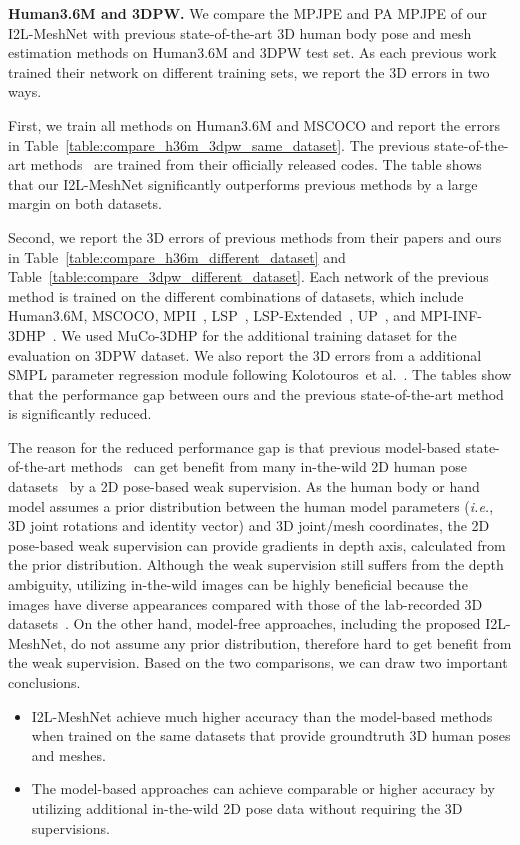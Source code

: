 \documentclass[runningheads]{llncs}
\begin{document}
\noindent \textbf{Human3.6M and 3DPW.}
We compare the MPJPE and PA MPJPE of our I2L-MeshNet with previous state-of-the-art 3D human body pose and mesh estimation methods on Human3.6M and 3DPW test set.
As each previous work trained their network on different training sets, we report the 3D errors in two ways.


First, we train all methods on Human3.6M and MSCOCO and report the errors in Table~\ref{table:compare_h36m_3dpw_same_dataset}.
The previous state-of-the-art methods~\cite{kanazawa2018end,kolotouros2019convolutional,kolotouros2019learning} are trained from their officially released codes.
The table shows that our I2L-MeshNet significantly outperforms previous methods by a large margin on both datasets.


Second, we report the 3D errors of previous methods from their papers and ours in Table~\ref{table:compare_h36m_different_dataset} and Table~\ref{table:compare_3dpw_different_dataset}. 
Each network of the previous method is trained on the different combinations of datasets, which include Human3.6M, MSCOCO, MPII~\cite{andriluka20142d}, LSP~\cite{johnson2010clustered}, LSP-Extended~\cite{johnson2011learning}, UP~\cite{lassner2017unite}, and MPI-INF-3DHP~\cite{mehta2017monocular}.
We used MuCo-3DHP for the additional training dataset for the evaluation on 3DPW dataset.
We also report the 3D errors from a additional SMPL parameter regression module following Kolotouros~et al.~\cite{kolotouros2019convolutional}.
The tables show that the performance gap between ours and the previous state-of-the-art method~\cite{kolotouros2019learning} is significantly reduced.


The reason for the reduced performance gap is that previous model-based state-of-the-art methods~\cite{kanazawa2018end,kolotouros2019learning} can get benefit from many in-the-wild 2D human pose datasets~\cite{lin2014microsoft,johnson2010clustered,johnson2011learning} by a 2D pose-based weak supervision.
As the human body or hand model assumes a prior distribution between the human model parameters (\textit{i.e.}, 3D joint rotations and identity vector) and 3D joint/mesh coordinates, the 2D pose-based weak supervision can provide gradients in depth axis, calculated from the prior distribution.
Although the weak supervision still suffers from the depth ambiguity, utilizing in-the-wild images can be highly beneficial because the images have diverse appearances compared with those of the lab-recorded 3D datasets~\cite{ionescu2014human3,mehta2017monocular,mehta2018single}.
On the other hand, model-free approaches, including the proposed I2L-MeshNet, do not assume any prior distribution, therefore hard to get benefit from the weak supervision.
Based on the two comparisons, we can draw two important conclusions.
\begin{itemize}
\item I2L-MeshNet achieve much higher accuracy than the model-based methods when trained on the same datasets that provide groundtruth 3D human poses and meshes.
\item The model-based approaches can achieve comparable or higher accuracy by utilizing additional in-the-wild 2D pose data without requiring the 3D supervisions.
\end{itemize}
\end{document}
